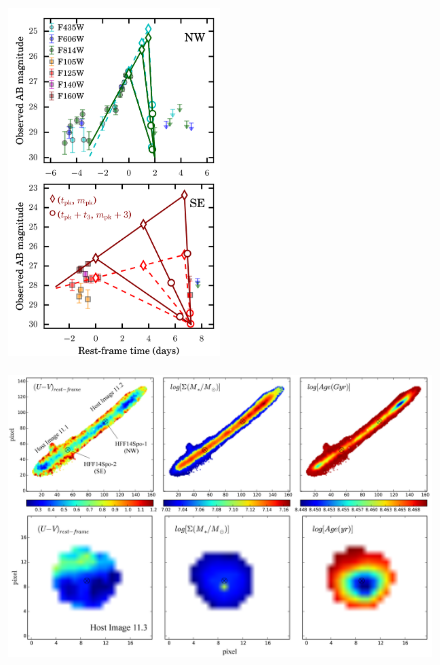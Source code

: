 \begin{supplementary}
\begin{figure}[tbp]
  \begin{center}
    \includegraphics[width=0.5\textwidth]{light_curve_linear_fits}
    \caption{\protect}
  \end{center}
\end{figure}

\begin{figure}[tbp]
  \begin{center}
    \includegraphics[width=\textwidth]{spock_hostgalaxy_properties.png}
    \caption{\protect}
  \end{center}
\end{figure}


\end{supplementary}
